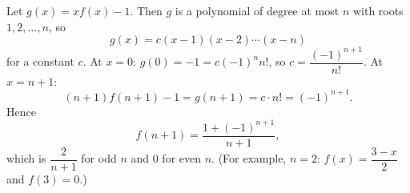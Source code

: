 Let $g(x)=xf(x)-1$. Then $g$ is a polynomial of degree at most $n$ with roots $1,2,\dots,n$, so
\[g(x)=c(x-1)(x-2)\cdots(x-n)\]
for a constant $c$. At $x=0$: $g(0)=-1=c(-1)^nn!$, so $c=\dfrac{(-1)^{n+1}}{n!}$. At $x=n+1$:
\[(n+1)f(n+1)-1=g(n+1)=c\cdot n!=(-1)^{n+1}.\]
Hence
\[f(n+1)=\boxed{\dfrac{1+(-1)^{n+1}}{n+1}},\]
which is $\dfrac{2}{n+1}$ for odd $n$ and $0$ for even $n$. (For example, $n=2$: $f(x)=\dfrac{3-x}{2}$ and $f(3)=0$.)
